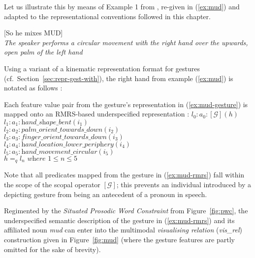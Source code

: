 \documentclass[output=paper
 	        ,biblatex
                ,babelshorthands
                ,newtxmath
                ,draftmode
                ,colorlinks, citecolor=brown
]{langscibook}
\begin{document}
Let us illustrate this by means of Example 1 from \citet[]{Alahverdzhieva:Lascarides:Flickinger:2017}, re-given in (\ref{ex:mud}) and adapted to the representational conventions followed in this chapter. 

\ea \label{ex:mud}
{[So he mixes MUD]} \\
{\textit{The speaker performs a circular movement with the right hand over the upwards, open palm of the left hand}} 
\z

Using a variant of a kinematic representation format for gestures (cf.\ Section~\ref{sec:repr-gest-with}), the right hand from example (\ref{ex:mud}) is notated as follows \citep[]{Alahverdzhieva:Lascarides:Flickinger:2017}:
%
\ea \label{ex:mud-gesture}
\z

\noindent Each feature value pair from the gesture's representation in (\ref{ex:mud-gesture}) is mapped onto an RMRS-based underspecified representation \citep[]{Alahverdzhieva:Lascarides:Flickinger:2017}:
%
\ea \label{ex:mud-rmrs}
$l_0 : a_0 : [\mathcal{G}](h)$ \\
$l_1 : a_1 : \textit{hand\_shape\_bent}(i_1)$ \\
$l_2 : a_2 : \textit{palm\_orient\_towards\_down}(i_2)$ \\
$l_3 : a_3 : \textit{finger\_orient\_towards\_down}(i_3)$ \\
$l_4 : a_4 : \textit{hand\_location\_lower\_periphery}(i_4)$ \\
$l_5 : a_5 : \textit{hand\_movement\_circular}(i_5)$ \\
$h =_q l_n \textit{ where } 1 \leq n \leq 5$
\z

\noindent Note that all predicates mapped from the gesture in (\ref{ex:mud-rmrs}) fall within the scope of the scopal operator $[\mathcal{G}]$; this prevents an individual introduced by a depicting gesture from being an antecedent of a pronoun in speech.

Regimented by the \emph{Situated Prosodic Word Constraint} from Figure~\ref{fig:pwc}, the underspecified semantic description of the gesture in (\ref{ex:mud-rmrs}) and its affiliated noun \textit{mud} can enter into the multimodal \emph{visualising relation} (\textit{vis\_rel}) construction given in Figure~\ref{fig:mud} (where the gesture features are partly omitted for the sake of brevity).
\end{document}
